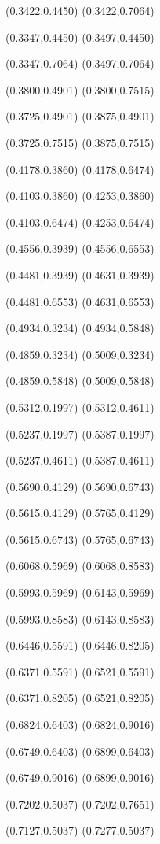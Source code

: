 \PST@Solid(0.3422,0.4450)
(0.3422,0.7064)

\PST@Solid(0.3347,0.4450)
(0.3497,0.4450)

\PST@Solid(0.3347,0.7064)
(0.3497,0.7064)

\PST@Solid(0.3800,0.4901)
(0.3800,0.7515)

\PST@Solid(0.3725,0.4901)
(0.3875,0.4901)

\PST@Solid(0.3725,0.7515)
(0.3875,0.7515)

\PST@Solid(0.4178,0.3860)
(0.4178,0.6474)

\PST@Solid(0.4103,0.3860)
(0.4253,0.3860)

\PST@Solid(0.4103,0.6474)
(0.4253,0.6474)

\PST@Solid(0.4556,0.3939)
(0.4556,0.6553)

\PST@Solid(0.4481,0.3939)
(0.4631,0.3939)

\PST@Solid(0.4481,0.6553)
(0.4631,0.6553)

\PST@Solid(0.4934,0.3234)
(0.4934,0.5848)

\PST@Solid(0.4859,0.3234)
(0.5009,0.3234)

\PST@Solid(0.4859,0.5848)
(0.5009,0.5848)

\PST@Solid(0.5312,0.1997)
(0.5312,0.4611)

\PST@Solid(0.5237,0.1997)
(0.5387,0.1997)

\PST@Solid(0.5237,0.4611)
(0.5387,0.4611)

\PST@Solid(0.5690,0.4129)
(0.5690,0.6743)

\PST@Solid(0.5615,0.4129)
(0.5765,0.4129)

\PST@Solid(0.5615,0.6743)
(0.5765,0.6743)

\PST@Solid(0.6068,0.5969)
(0.6068,0.8583)

\PST@Solid(0.5993,0.5969)
(0.6143,0.5969)

\PST@Solid(0.5993,0.8583)
(0.6143,0.8583)

\PST@Solid(0.6446,0.5591)
(0.6446,0.8205)

\PST@Solid(0.6371,0.5591)
(0.6521,0.5591)

\PST@Solid(0.6371,0.8205)
(0.6521,0.8205)

\PST@Solid(0.6824,0.6403)
(0.6824,0.9016)

\PST@Solid(0.6749,0.6403)
(0.6899,0.6403)

\PST@Solid(0.6749,0.9016)
(0.6899,0.9016)

\PST@Solid(0.7202,0.5037)
(0.7202,0.7651)

\PST@Solid(0.7127,0.5037)
(0.7277,0.5037)

